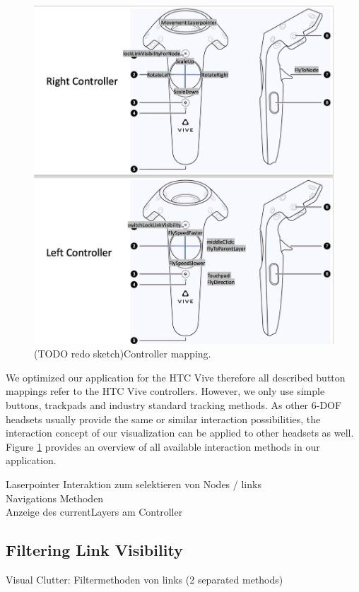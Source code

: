 \begin{figure}[h]
    \centering
    \includegraphics[width=1\textwidth]{chapters/graphics/controllerMapping.jpg}
    \caption{(TODO redo sketch)Controller mapping.} 
    \label{fig:controllerMapping} 
\end{figure}

We optimized our application for the HTC Vive therefore all described button mappings refer to the HTC Vive controllers. However, we only use simple buttons, trackpads and industry standard tracking methods. 
As other 6-DOF headsets usually provide the same or similar interaction possibilities, the interaction concept of our visualization can be applied to other headsets as well.\\
Figure \ref{fig:controllerMapping} provides an overview of all available interaction methods in our application. 

Laserpointer Interaktion zum selektieren von Nodes / links\\
Navigations Methoden\\
Anzeige des currentLayers am Controller\\

\subsection{Filtering Link Visibility}
Visual Clutter: Filtermethoden von links (2 separated methods)\\

